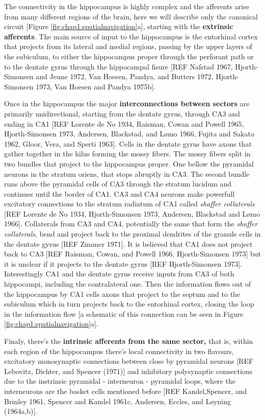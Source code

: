 The connectivity in the hippocampus is highly complex and the afferents arise from many different regions of the brain, here we will describe only the canonical circuit [Figure \ref{fig:chap1:spatialnavigation}a], starting with the \textbf{extrinsic afferents}. 
The main source of input to the hippocampus is the entorhinal cortex that projects from its lateral and medial regions, passing by the upper layers of the subiculum, to either the hippocampus proper through the perforant path or to the dentate gyrus through the hippocampal fisure [REF Nafstad 1967, Hjorth-Simonsen and Jeune 1972, Van Hoesen, Pandya, and Butters 1972, Hjorth-Simonsen 1973, Van Hoesen and Pandya 1975b].

Once in the hippocampus the major \textbf{interconnections between sectors} are primarily unidirectional, starting from the dentate gyrus, through CA3 and ending in CA1 [REF Lorente de No 1934, Raisman, Cowan and Powell 1965, Hjorth-Simonsen 1973, Andersen, Blackstad, and Lømo 1966, Fujita and Sakata 1962, Gloor, Vera, and Sperti 1963].   
Cells in the dentate gyrus have axons that gather together in the hilus forming the mossy fibers. The mossy fibers split in two bundles that project to the hippocampus proper. 
One bellow the pyramidal neurons in the stratum oriens, that stops abruptly in CA3.
The second bundle runs above the pyramidal cells of CA3 through the stratum lucidum and continues until the border of CA1.
CA3 and CA4 neurons make powerfull excitatory connections to the stratum radiatum of CA1 called \textit{shaffer collaterals} [REF Lorente de No 1934, Hjorth-Simonsen 1973, Andersen, Blackstad and Lømo 1966]. 
Collaterals from CA3 and CA4, potentially the same that form the \textit{shaffer collaterals}, bend and project back to the proximal dendrites of the granule cells in the dentate gyrus [REF Zimmer 1971].
It is believed that CA1 does not project back to CA3 [REF Raisman, Cowan, and Powell 1966, Hjorth-Simonsen 1973] but it is unclear if it projects to the dentate gyrus [REF Hjorth-Simonsen 1973].
Interestingly CA1 and the dentate gyrus receive inputs from CA3 of both hippocampi, including the contralateral one.
Then the information flows out of the hippocampus by CA1 cells axons that project to the septum and to the subiculum which in turn projects back to the entorhinal cortex, closing the loop in the information flow [a schematic of this connection can be seen in Figure \ref{fig:chap1:spatialnavigation}a].

Finaly, there's the \textbf{intrinsic afferents from the same sector,} that is, within each region of the hippocampus there's local connectivity in two flavours, excitatory monosynaptic connections between close by pyramidal neurons [REF Lebovitz, Dichter, and Spencer (1971)] and inhibitory polysynaptic connections due to the instrinsic pyramidal - interneuron - pyramidal loops, where the interneurons are the basket cells mentioned before [REF Kandel,Spencer, and Brinley 1961, Spencer and Kandel 1961c, Andersen, Eccles, and Løyning (1964a,b)].

